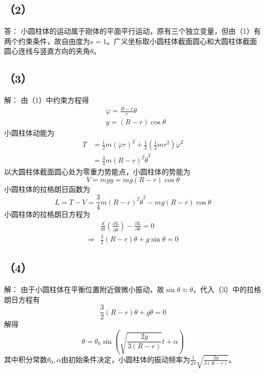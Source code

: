 \documentclass[10pt,a4paper]{article}
\begin{document}
\subsection*{（2）}答：
小圆柱体的运动属于刚体的平面平行运动，原有三个独立变量，但由（1）有两个约束条件，故自由度为$s=1$。广义坐标取小圆柱体截面圆心和大圆柱体截面圆心连线与竖直方向的夹角$\theta$。
\subsection*{（3）}解：
由（1）中约束方程得
\begin{align*}
&\dot{\varphi} = \frac{R-r}{r}\theta\\
&y = (R-r)\cos\theta
\end{align*}
小圆柱体动能为
\begin{align*}
T &= \frac{1}{2}m(\dot{\varphi} r)^2+\frac{1}{2}(\frac{1}{2}mr^2)\dot{\varphi}^2\\
&= \frac{3}{4}m(R-r)^2\dot{\theta}^2
\end{align*}
以大圆柱体截面圆心处为零重力势能点，小圆柱体的势能为
\[
V = mgy = mg(R-r)\cos\theta
\]
小圆柱体的拉格朗日函数为
\[
L = T-V = \frac{3}{4}m(R-r)^2\dot{\theta}^2-mg(R-r)\cos\theta
\]
小圆柱体的拉格朗日方程为
\begin{align*}
&\frac{d}{dt}(\frac{\partial L}{\partial\dot{\theta}})-\frac{\partial L}{\partial\theta} = 0\\
\Longrightarrow&\frac{3}{2}(R-r)\ddot{\theta}+g\sin\theta = 0
\end{align*}
\subsection*{（4）}解：
由于小圆柱体在平衡位置附近做微小振动，故$\sin\theta\approx\theta$，代入（3）中的拉格朗日方程有
\[
\frac{3}{2}(R-r)\ddot{\theta}+g\theta = 0
\]
解得
\[
\theta = \theta_0\sin(\sqrt{\frac{2g}{3(R-r)}}t+\alpha)
\]
其中积分常数$\theta_0,\alpha$由初始条件决定，小圆柱体的振动频率为$\frac{1}{2\pi}\sqrt{\frac{2g}{3(R-r)}}$。
\end{document}

